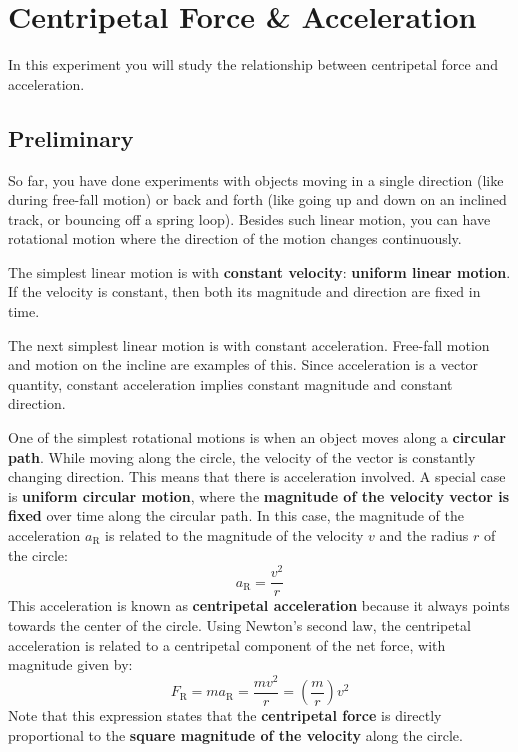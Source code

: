 \setcounter{chapter}{5}
\chapter{Centripetal Force \& Acceleration}
%
In this experiment you will study the relationship between centripetal force and acceleration.
%
\section{Preliminary}
%
So far, you have done experiments with objects moving in a single direction (like during free-fall motion) or back and forth (like going up and down on an inclined track, or bouncing off a spring loop). Besides such linear motion, you can have rotational motion where the direction of the motion changes continuously.

The simplest linear motion is with \textbf{constant velocity}: \textbf{uniform linear motion}. If the velocity is constant, then both its magnitude and direction are fixed in time.

The next simplest linear motion is with constant acceleration. Free-fall motion and motion on the incline are examples of this. Since acceleration is a vector quantity, constant acceleration implies constant magnitude and constant direction.

One of the simplest rotational motions is when an object moves along a \textbf{circular path}. While moving along the circle, the velocity of the vector is constantly changing direction. This means that there is acceleration involved. A special case is \textbf{uniform circular motion}, where the \textbf{magnitude of the velocity vector is fixed} over time along the circular path. In this case, the magnitude of the acceleration $a_{\text{R}}$ is related to the magnitude of the velocity $v$ and the radius $r$ of the circle:
\begin{equation}
    a_{\text{R}} = \frac{v^{2}}{r}
\end{equation}
This acceleration is known as \textbf{centripetal acceleration} because it always points towards the center of the circle. Using Newton's second law, the centripetal acceleration is related to a centripetal component of the net force, with magnitude given by:
\begin{equation}
    F_{\text{R}} = m a_{\text{R}} = \frac{m v^{2}}{r} = \left(\frac{m}{r}\right) v^{2}
    \label{eq.06.force.velocity}
\end{equation}
Note that this expression states that the \textbf{centripetal force} is directly proportional to the \textbf{square magnitude of the velocity} along the circle.

